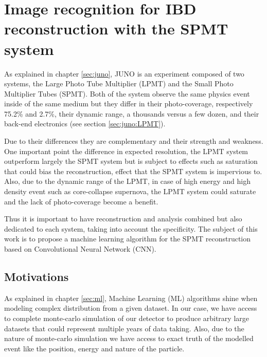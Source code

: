 \chapter{Image recognition for IBD reconstruction with the SPMT system}
\label{sec:jcnn}

As explained in chapter \ref{sec:juno}, JUNO is an experiment composed of two systems, the Large Photo Tube Multiplier (LPMT) and the Small Photo Multiplier Tubes (SPMT). Both of the system observe the same physics event inside of the same medium but they differ in their photo-coverage, respectively 75.2\% and 2.7\%, their dynamic range, a thousands versus a few dozen, and their back-end electronics (see section \ref{sec:juno:LPMT}).

Due to their differences they are complementary and their strength and weakness. One important point the difference in expected resolution, the LPMT system outperform largely the SPMT system but is subject to effects such as saturation \cite{juno_collaboration_calibration_2021} that could bias the reconstruction, effect that the SPMT system is impervious to. Also, due to the dynamic range of the LPMT, in case of high energy and high density event such as core-collapse supernova, the LPMT system could saturate and the lack of photo-coverage become a benefit.

Thus it is important to have reconstruction and analysis combined but also dedicated to each system, taking into account the specificity. The subject of this work is to propose a machine learning algorithm for the SPMT reconstruction based on Convolutional Neural Network (CNN).

\section{Motivations}


As explained in chapter \ref{sec:ml}, Machine Learning (ML) algorithms shine when modeling complex distribution from a given dataset. In our case, we have access to complete monte-carlo simulation of our detector to produce arbitrary large datasets that could represent multiple years of data taking. Also, due to the nature of monte-carlo simulation we have access to exact truth of the modelled event like the position, energy and nature of the particle.

